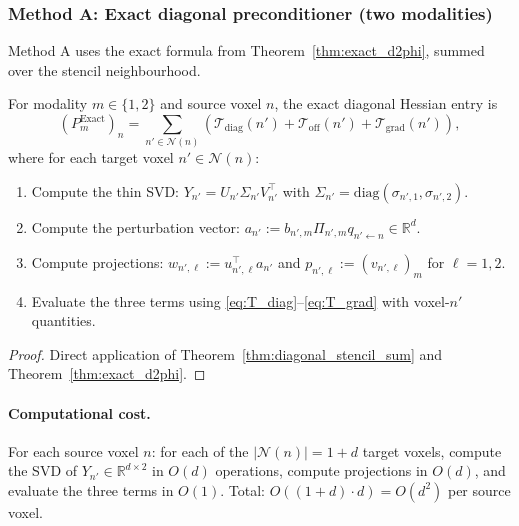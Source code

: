 \subsubsection{Method A: Exact diagonal preconditioner (two modalities)}
\label{subsubsec:method_A}

Method A uses the exact formula from Theorem~\ref{thm:exact_d2phi}, summed over the stencil neighbourhood.

\begin{theorem}
\label{thm:method_A}
For modality $m \in \{1, 2\}$ and source voxel $n$, the exact diagonal Hessian entry is
\begin{equation}
(P_m^{\mathrm{Exact}})_n = \sum_{n' \in \mathcal{N}(n)} \left( \mathcal{T}_{\mathrm{diag}}(n') + \mathcal{T}_{\mathrm{off}}(n') + \mathcal{T}_{\mathrm{grad}}(n') \right),
\end{equation}
where for each target voxel $n' \in \mathcal{N}(n)$:
\begin{enumerate}
    \item Compute the thin SVD: $Y_{n'} = U_{n'} \Sigma_{n'} V_{n'}^\top$ with $\Sigma_{n'} = \mathrm{diag}(\sigma_{n',1}, \sigma_{n',2})$.
    \item Compute the perturbation vector: $a_{n'} := b_{n',m} \Pi_{n',m} q_{n' \leftarrow n} \in \mathbb{R}^d$.
    \item Compute projections: $w_{n',\ell} := u_{n',\ell}^\top a_{n'}$ and $p_{n',\ell} := (v_{n',\ell})_m$ for $\ell = 1, 2$.
    \item Evaluate the three terms using \eqref{eq:T_diag}--\eqref{eq:T_grad} with voxel-$n'$ quantities.
\end{enumerate}
\end{theorem}

\begin{proof}
Direct application of Theorem~\ref{thm:diagonal_stencil_sum} and Theorem~\ref{thm:exact_d2phi}.
\end{proof}

\paragraph{Computational cost.} For each source voxel $n$: for each of the $|\mathcal{N}(n)| = 1 + d$ target voxels, compute the SVD of $Y_{n'} \in \mathbb{R}^{d \times 2}$ in $O(d)$ operations, compute projections in $O(d)$, and evaluate the three terms in $O(1)$. Total: $O((1+d) \cdot d) = O(d^2)$ per source voxel.

